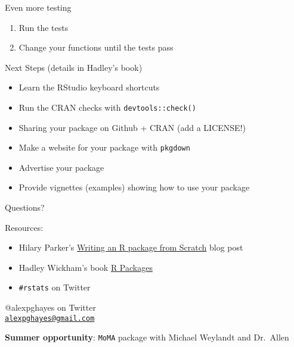 \documentclass[12pt,ignorenonframetext,compress]{beamer}
\providecommand{\tightlist}{%
  \setlength{\itemsep}{0pt}\setlength{\parskip}{0pt}}
\begin{document}
\begin{frame}{Even more testing}

\begin{enumerate}
\def\labelenumi{\arabic{enumi}.}
\setcounter{enumi}{2}
\tightlist
\item
  Run the tests
\item
  Change your functions until the tests pass
\end{enumerate}

\end{frame}

\begin{frame}[fragile]{Next Steps (details in Hadley's book)}

\begin{itemize}
\tightlist
\item
  Learn the RStudio keyboard shortcuts
\item
  Run the CRAN checks with \texttt{devtools::check()}
\item
  Sharing your package on Github + CRAN (add a LICENSE!)
\item
  Make a website for your package with \texttt{pkgdown}
\item
  Advertise your package
\item
  Provide vignettes (examples) showing how to use your package
\end{itemize}

\end{frame}

\begin{frame}[fragile]{Questions?}

Resources:

\begin{itemize}
\tightlist
\item
  Hilary Parker's
  \href{https://hilaryparker.com/2014/04/29/writing-an-r-package-from-scratch/}{Writing
  an R package from Scratch} blog post
\item
  Hadley Wickham's book \href{http://r-pkgs.had.co.nz/}{R Packages}
\item
  \texttt{\#rstats} on Twitter
\end{itemize}

@alexpghayes on Twitter\\
\href{mailto:alexpghayes@gmail.com}{\nolinkurl{alexpghayes@gmail.com}}

\textbf{Summer opportunity}: \texttt{MoMA} package with Michael Weylandt
and Dr.~Allen

\end{frame}
\end{document}
